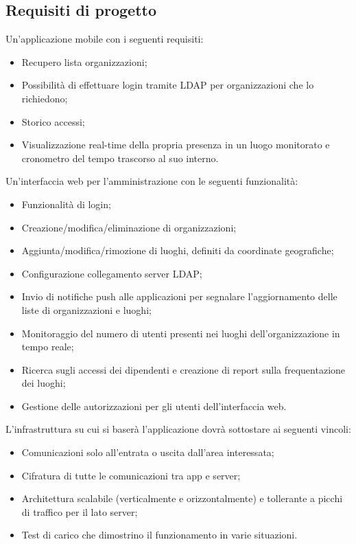 \subsection{Requisiti di progetto}
Un'applicazione mobile con i seguenti requisiti:
\begin{itemize}
	\item Recupero lista organizzazioni;
	\item Possibilità di effettuare login tramite LDAP per organizzazioni che lo richiedono;
	\item Storico accessi;
	\item Visualizzazione real-time della propria presenza in un luogo monitorato e cronometro del tempo trascorso al suo interno.
\end{itemize}
Un'interfaccia web per l'amministrazione con le seguenti funzionalità:
\begin{itemize}
	\item Funzionalità di login;
	\item Creazione/modifica/eliminazione di organizzazioni;
	\item Aggiunta/modifica/rimozione di luoghi, definiti da coordinate geografiche;
	\item Configurazione collegamento server LDAP;
	\item Invio di notifiche push alle applicazioni per segnalare l'aggiornamento delle liste di organizzazioni e luoghi;
	\item Monitoraggio del numero di utenti presenti nei luoghi dell'organizzazione in tempo reale;
	\item Ricerca sugli accessi dei dipendenti e creazione di report sulla frequentazione dei luoghi;
	\item Gestione delle autorizzazioni per gli utenti dell'interfaccia web.
\end{itemize}
L'infrastruttura su cui si baserà l'applicazione dovrà sottostare ai seguenti vincoli:
\begin{itemize}
	\item Comunicazioni solo all'entrata o uscita dall'area interessata;
	\item Cifratura di tutte le comunicazioni tra app e server;
	\item Architettura scalabile (verticalmente e orizzontalmente) e tollerante a picchi di traffico per il lato server;
	\item Test di carico che dimostrino il funzionamento in varie situazioni.
\end{itemize}

